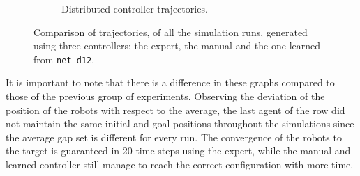 \begin{figure}[!htb]
\begin{center}
\begin{subfigure}[h]{0.49\textwidth}
			\caption{Distributed controller trajectories.}
		\end{subfigure}
	\end{center}
	\vspace{-0.5cm}
	\caption[Evaluation of the trajectories learned by 
	\texttt{net-d12}.]{Comparison of trajectories, of all the simulation runs, 
	generated using three controllers: 
		the expert, the manual and the one learned from \texttt{net-d12}.}
	\label{fig:net-d12traj}
\end{figure}
It is important to note that there is a difference in these graphs compared to 
those of the previous group of experiments. Observing the deviation of the 
position of the robots with respect to the average, the last agent of the row did 
not maintain the same initial and goal positions throughout the simulations since 
the average gap set is different for every run.
The convergence of the robots to the target is guaranteed in 20 time steps using 
the expert, while the manual and learned controller still manage to reach the 
correct configuration with more time.

